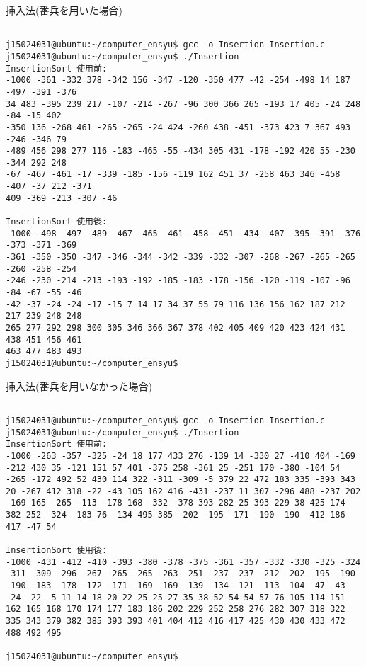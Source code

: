 \documentclass[a4j,titlepage]{jarticle}
\begin{document}
\begin{breakitembox}[l]{挿入法(番兵を用いた場合)} \small
\begin{verbatim}

j15024031@ubuntu:~/computer_ensyu$ gcc -o Insertion Insertion.c
j15024031@ubuntu:~/computer_ensyu$ ./Insertion
InsertionSort 使用前:
-1000 -361 -332 378 -342 156 -347 -120 -350 477 -42 -254 -498 14 187 -497 -391 -376 
34 483 -395 239 217 -107 -214 -267 -96 300 366 265 -193 17 405 -24 248 -84 -15 402 
-350 136 -268 461 -265 -265 -24 424 -260 438 -451 -373 423 7 367 493 -246 -346 79 
-489 456 298 277 116 -183 -465 -55 -434 305 431 -178 -192 420 55 -230 -344 292 248 
-67 -467 -461 -17 -339 -185 -156 -119 162 451 37 -258 463 346 -458 -407 -37 212 -371
409 -369 -213 -307 -46 

InsertionSort 使用後:
-1000 -498 -497 -489 -467 -465 -461 -458 -451 -434 -407 -395 -391 -376 -373 -371 -369 
-361 -350 -350 -347 -346 -344 -342 -339 -332 -307 -268 -267 -265 -265 -260 -258 -254
-246 -230 -214 -213 -193 -192 -185 -183 -178 -156 -120 -119 -107 -96 -84 -67 -55 -46 
-42 -37 -24 -24 -17 -15 7 14 17 34 37 55 79 116 136 156 162 187 212 217 239 248 248 
265 277 292 298 300 305 346 366 367 378 402 405 409 420 423 424 431 438 451 456 461 
463 477 483 493 
j15024031@ubuntu:~/computer_ensyu$ 
\end{verbatim}
\end{breakitembox}

\begin{breakitembox}[l]{挿入法(番兵を用いなかった場合)} \small
\begin{verbatim}

j15024031@ubuntu:~/computer_ensyu$ gcc -o Insertion Insertion.c
j15024031@ubuntu:~/computer_ensyu$ ./Insertion
InsertionSort 使用前:
-1000 -263 -357 -325 -24 18 177 433 276 -139 14 -330 27 -410 404 -169 -212 430 35 -121 151 57 401 -375 258 -361 25 -251 170 -380 -104 54 -265 -172 492 52 430 114 322 -311 -309 -5 379 22 472 183 335 -393 343 20 -267 412 318 -22 -43 105 162 416 -431 -237 11 307 -296 488 -237 202 -169 165 -265 -113 -178 168 -332 -378 393 282 25 393 229 38 425 174 382 252 -324 -183 76 -134 495 385 -202 -195 -171 -190 -190 -412 186 417 -47 54 

InsertionSort 使用後:
-1000 -431 -412 -410 -393 -380 -378 -375 -361 -357 -332 -330 -325 -324 -311 -309 -296 -267 -265 -265 -263 -251 -237 -237 -212 -202 -195 -190 -190 -183 -178 -172 -171 -169 -169 -139 -134 -121 -113 -104 -47 -43 -24 -22 -5 11 14 18 20 22 25 25 27 35 38 52 54 54 57 76 105 114 151 162 165 168 170 174 177 183 186 202 229 252 258 276 282 307 318 322 335 343 379 382 385 393 393 401 404 412 416 417 425 430 430 433 472 488 492 495 

j15024031@ubuntu:~/computer_ensyu$ 
\end{verbatim}
\end{breakitembox}
\end{document}
